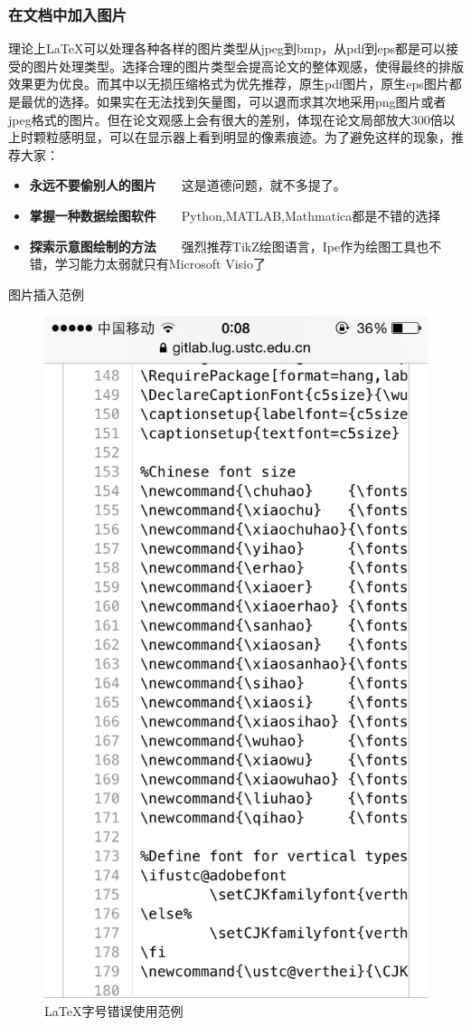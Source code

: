 \subsubsection{在文档中加入图片}
理论上\LaTeX 可以处理各种各样的图片类型从jpeg到bmp，从pdf到eps都是可以接受的图片处理类型。选择合理的图片类型会提高论文的整体观感，使得最终的排版效果更为优良。而其中以无损压缩格式为优先推荐，原生pdf图片，原生eps图片都是最优的选择。如果实在无法找到矢量图，可以退而求其次地采用png图片或者jpeg格式的图片。但在论文观感上会有很大的差别，体现在论文局部放大300倍以上时颗粒感明显，可以在显示器上看到明显的像素痕迹。为了避免这样的现象，推荐大家：
\begin{itemize}
\item \textbf{永远不要偷别人的图片}~~~~这是道德问题，就不多提了。
\item \textbf{掌握一种数据绘图软件}~~~~Python,MATLAB,Mathmatica都是不错的选择
\item \textbf{探索示意图绘制的方法}~~~~强烈推荐TikZ绘图语言，Ipe作为绘图工具也不错，学习能力太弱就只有Microsoft Visio了
\end{itemize}
图片插入范例
\begin{figure}[thbp!]
\centering
\includegraphics[width=0.6\linewidth]{figure/IMG_1832}
\caption{\LaTeX 字号错误使用范例}
\label{fig:IMG_1832}
\end{figure}

